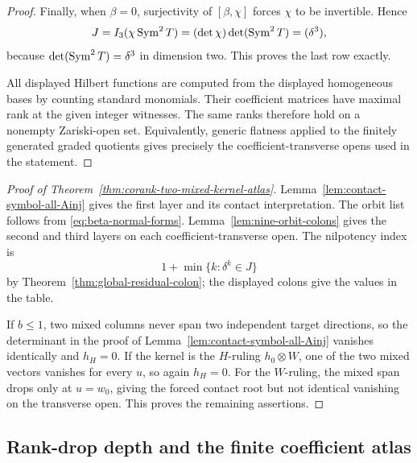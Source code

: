 \begin{proof}
Finally, when \(\beta=0\), surjectivity of
\([\beta,\chi]\) forces \(\chi\) to be invertible.  Hence
\[
 J=I_3(\chi\operatorname{Sym}^2T)
   =(\det\chi)\det(\operatorname{Sym}^2T)
   =(\delta^3),
\]
because \(\det(\operatorname{Sym}^2T)=\delta^3\) in dimension two.  This proves the
last row exactly.

All displayed Hilbert functions are computed from the displayed
homogeneous bases by counting standard monomials.  Their coefficient
matrices have maximal rank at the given integer witnesses.  The same
ranks therefore hold on a nonempty Zariski-open set.  Equivalently,
generic flatness applied to the finitely generated graded quotients
gives precisely the coefficient-transverse opens used in the
statement.
\end{proof}

\begin{proof}[Proof of Theorem~\ref{thm:corank-two-mixed-kernel-atlas}]
Lemma~\ref{lem:contact-symbol-all-Ainj} gives the first layer and its
contact interpretation.  The orbit list follows from
\eqref{eq:beta-normal-forms}.  Lemma~\ref{lem:nine-orbit-colons}
gives the second and third layers on each coefficient-transverse open.
The nilpotency index is
\[
 1+\min\{k:\delta^k\in J\}
\]
by Theorem~\ref{thm:global-residual-colon}; the displayed colons give
the values in the table.

If \(b\le1\), two mixed columns never span two independent target
directions, so the determinant in the proof of
Lemma~\ref{lem:contact-symbol-all-Ainj} vanishes identically and
\(h_H=0\).  If the kernel is the \(H\)-ruling
\(h_0\otimes W\), one of the two mixed vectors vanishes for every
\(u\), so again \(h_H=0\).  For the \(W\)-ruling, the mixed span
drops only at \(u=w_0\), giving the forced contact root but not
identical vanishing on the transverse open.  This proves the
remaining assertions.
\end{proof}

\subsection{Rank-drop depth and the finite coefficient atlas}

